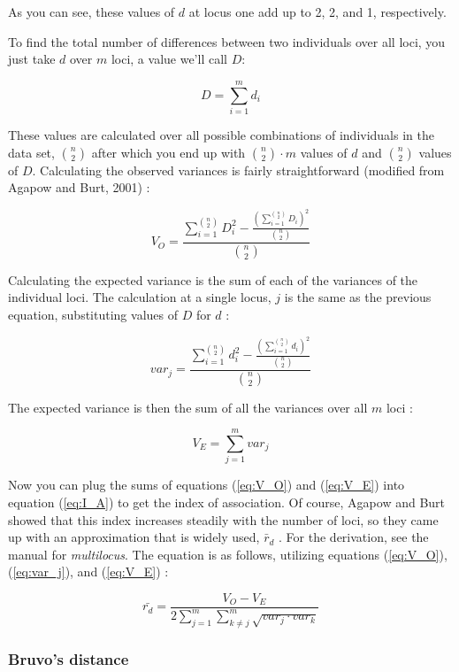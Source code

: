 \documentclass[letterpaper]{article}\usepackage[]{graphicx}\usepackage[]{color}
\newcommand{\beq}{\begin{equation}}
\newcommand{\eeq}{\end{equation}}
\begin{document}
As you can see, these values of $d$ at locus one add up to 2, 2, and 1, respectively.

To find the total number of differences between two individuals over all loci, you just take $d$ over $m$ loci, a value we'll call $D$:

\beq
\label{eq:ia_D}
D = \displaystyle \sum_{i=1}^{m} d_i
\eeq

These values are calculated over all possible combinations of individuals in the data set, ${n \choose 2}$ after which you end up with ${n \choose 2}\cdot{}m$ values of $d$ and ${n \choose 2}$ values of $D$.
Calculating the observed variances is fairly straightforward (modified from Agapow and Burt, 2001) \cite{Agapow:2001}:

\beq
\label{eq:V_O}
V_O = \frac{\displaystyle \sum_{i=1}^{n \choose 2} D_{i}^2 - \frac{(\displaystyle\sum_{i=1}^{n \choose 2} D_{i})^2}{{n \choose 2}}}{{n \choose 2}}
\eeq

Calculating the expected variance is the sum of each of the variances of the individual loci. The calculation at a single locus, $j$ is the same as the previous equation, substituting values of $D$ for $d$ \cite{Agapow:2001}:

\beq
\label{eq:var_j}
var_j = \frac{\displaystyle \sum_{i=1}^{n \choose 2} d_{i}^2 - \frac{(\displaystyle\sum_{i=1}^{n \choose 2} d_i)^2}{{n \choose 2}}}{{n \choose 2}}
\eeq

The expected variance is then the sum of all the variances over all $m$ loci \cite{Agapow:2001}:

\beq
\label{eq:V_E}
V_E = \displaystyle \sum_{j=1}^{m} var_j
\eeq

Now you can plug the sums of equations (\ref{eq:V_O}) and (\ref{eq:V_E}) into equation (\ref{eq:I_A}) to get the index of association.
Of course, Agapow and Burt showed that this index increases steadily with the number of loci, so they came up with an approximation that is widely used, $\bar r_d$ \cite{Agapow:2001}. For the derivation, see the manual for \textit{multilocus}. The equation is as follows, utilizing equations (\ref{eq:V_O}), (\ref{eq:var_j}), and (\ref{eq:V_E}) \cite{Agapow:2001}:

\beq
\label{eq:r_d}
\bar{r_d} = \frac{V_O - V_E}
{2\displaystyle \sum_{j=1}^{m}\displaystyle \sum_{k \neq j}^{m}\sqrt{var_j\cdot{}var_k}}
\eeq

\subsubsection{Bruvo's distance}\label{appendix:algorithm:bruvo}
\end{document}
